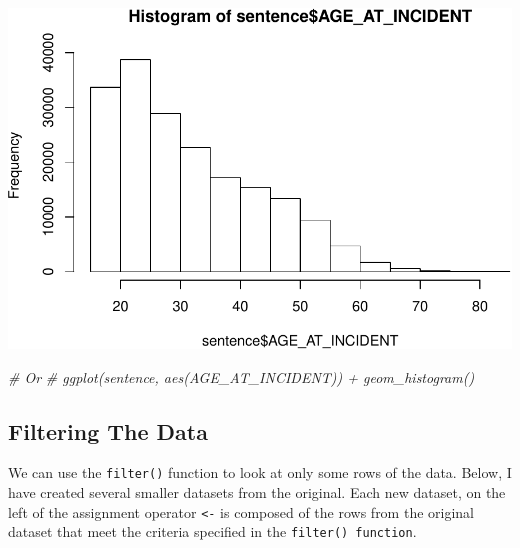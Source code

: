 \documentclass[]{article}
\newenvironment{Shaded}{\begin{snugshade}}{\end{snugshade}}
\newcommand{\KeywordTok}[1]{\textcolor[rgb]{0.13,0.29,0.53}{\textbf{#1}}}
\newcommand{\DecValTok}[1]{\textcolor[rgb]{0.00,0.00,0.81}{#1}}
\newcommand{\StringTok}[1]{\textcolor[rgb]{0.31,0.60,0.02}{#1}}
\newcommand{\CommentTok}[1]{\textcolor[rgb]{0.56,0.35,0.01}{\textit{#1}}}
\newcommand{\OperatorTok}[1]{\textcolor[rgb]{0.81,0.36,0.00}{\textbf{#1}}}
\newcommand{\NormalTok}[1]{#1}
\begin{document}
\includegraphics{HFJ-RStats_files/figure-latex/unnamed-chunk-11-1.pdf}

\begin{Shaded}
\begin{Highlighting}[]
\CommentTok{# Or}
\CommentTok{# ggplot(sentence, aes(AGE_AT_INCIDENT)) + geom_histogram()}
\end{Highlighting}
\end{Shaded}

\subsection{Filtering The Data}\label{filtering-the-data}

We can use the \texttt{filter()} function to look at only some rows of
the data. Below, I have created several smaller datasets from the
original. Each new dataset, on the left of the assignment operator
\texttt{\textless{}-} is composed of the rows from the original dataset
that meet the criteria specified in the \texttt{filter()\ function}.

\begin{Shaded}
\end{Shaded}
\end{document}
